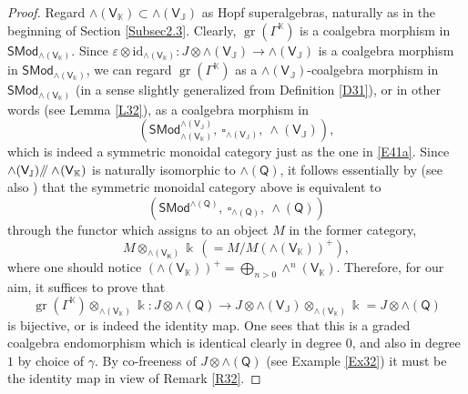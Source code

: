 \documentclass[11pt, a4paper]{amsart}
\theoremstyle{definition}
\numberwithin{equation}{section}
\begin{document}
\begin{proof}
Regard $\wedge(\mathsf{V}_{\mathbb{K}})\subset \wedge(\mathsf{V}_{\mathbb{J}})$
as Hopf superalgebras, naturally
as in the beginning of Section \ref{Subsec2.3}. 
Clearly, $\operatorname{gr}(\Gamma^{\mathbb{K}})$ is a coalgebra morphism in $\mathsf{SMod}_{\wedge(\mathsf{V}_{\mathbb{K}})}$.
Since $\varepsilon \otimes \mathrm{id}_{\wedge(\mathsf{V}_{\mathbb{K}})} : J \otimes \wedge(\mathsf{V}_{\mathbb{J}}) \to \wedge(\mathsf{V}_{\mathbb{J}})$ is a coalgebra morphism in $\mathsf{SMod}_{\wedge(\mathsf{V}_{\mathbb{K}})}$,
we can regard $\operatorname{gr}(\Gamma^{\mathbb{K}})$ as a $\wedge(\mathsf{V}_{\mathbb{J}})$-coalgebra morphism 
in $\mathsf{SMod}_{\wedge(\mathsf{V}_{\mathbb{K}})}$ (in a sense slightly generalized from Definition \ref{D31}), 
or in other words (see Lemma \ref{L32}), as a coalgebra morphism in 
\[ (\mathsf{SMod}_{\wedge(\mathsf{V}_{\mathbb{K}})}^{\wedge(\mathsf{V}_{\mathbb{J}})},\ \square_{\wedge(\mathsf{V}_{\mathbb{J}})},\ \wedge(\mathsf{V}_{\mathbb{J}})), \]
which is indeed a symmetric monoidal category just as the one in \eqref{E41a}. 
Since $\wedge(\mathsf{V}_{\mathbb{J}})/\hspace{-1mm}/\wedge\! (\mathsf{V}_{\mathbb{K}})$
is naturally isomorphic to $\wedge(\mathsf{Q})$,  it follows essentially by \cite[Theorem 1]{T} (see also \cite[Proposition 1.1]{M2}) 
that the symmetric monoidal category above is equivalent to
\[ (\mathsf{SMod}^{\wedge(\mathsf{Q})},\ \square_{\wedge(\mathsf{Q})},\ \wedge(\mathsf{Q})) \]
through the functor which assigns to an object $M$ in the former category,
\[ M \otimes_{\wedge(\mathsf{V}_{\mathsf{K}})} \Bbbk \, (= M/M(\wedge(\mathsf{V}_{\mathbb{K}}))^+),  \]
where one should notice $(\wedge(\mathsf{V}_{\mathbb{K}}))^+=\bigoplus_{n>0}\wedge^n(\mathsf{V}_{\mathbb{K}})$.
Therefore, for our aim, it suffices to prove that
\[ \operatorname{gr}(\Gamma^{\mathbb{K}}) \otimes_{\wedge(\mathsf{V}_{\mathbb{K}})} \Bbbk: J \otimes \wedge(\mathsf{Q}) \to J \otimes \wedge(\mathsf{V}_{\mathbb{J}}) \otimes_{\wedge(\mathsf{V}_{\mathbb{K}})} \Bbbk = J \otimes \wedge(\mathsf{Q}) \]
is bijective, or is indeed the identity map.
One sees that this is a graded coalgebra endomorphism which is identical clearly in degree $0$, and also in degree $1$
by choice of $\gamma$. 
By co-freeness of $J \otimes \wedge(\mathsf{Q})$ (see Example \ref{Ex32}) it must be the identity map 
in view of Remark \ref{R32}. 
\end{proof}
\end{document}

